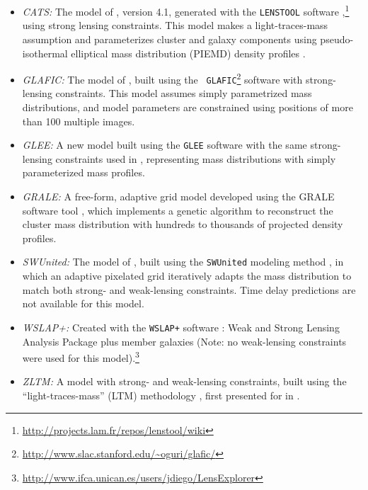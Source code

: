 \bigskip
\begin{itemize}
\item{{\it CATS:} The model of \citet{Jauzac:2014}, version 4.1, generated with
  the {\tt LENSTOOL} software
  \citep{Jullo:2007},\footnote{\url{http://projects.lam.fr/repos/lenstool/wiki}}}
  using strong lensing constraints.  This model makes a
  light-traces-mass assumption and parameterizes cluster and galaxy components
  using pseudo-isothermal elliptical mass distribution (PIEMD) density profiles
  \citep{Eliasdottir:2007, Limousin:2007}. 
\item{\it GLAFIC:} The model of \citet{Kawamata:2016}, built using the
  {\tt
    GLAFIC}\footnote{\url{http://www.slac.stanford.edu/~oguri/glafic/}}
  software \citep{Oguri:2010b} with strong-lensing constraints. This
  model assumes simply parametrized mass distributions, and model
  parameters are constrained using positions of more than 100 multiple
  images.
\item{\it GLEE:} A new model built using the {\tt GLEE} software
  \citep{Suyu:2010b, Suyu:2012} with the same strong-lensing
  constraints used in \citet{Caminha:2017}, representing mass
  distributions with simply parameterized mass profiles. 
\item{{\it GRALE:} A free-form, adaptive grid model developed using
  the GRALE software tool \citep{Liesenborgs:2006, Liesenborgs:2007,
    Mohammed:2014, Sebesta:2016}, which implements a genetic algorithm
  to reconstruct the cluster mass distribution with hundreds to
  thousands of projected \citet{Plummer:1911} density profiles.}
\item{\it SWUnited:} The model of \citet{Hoag:2016}, built using the
  {\tt SWUnited} modeling method \citep{Bradac:2005, Bradac:2009}, in
  which an adaptive pixelated grid iteratively adapts the mass
  distribution to match both strong- and weak-lensing constraints.
  Time delay predictions are not available for this model.
\item{\it WSLAP+:} Created with the {\tt WSLAP+} software
  \citep{Sendra:2014}: Weak and Strong Lensing Analysis Package plus
  member galaxies (Note: no weak-lensing constraints were used for
  this 
  model).\footnote{\url{http://www.ifca.unican.es/users/jdiego/LensExplorer}}
\item{{\it ZLTM:} A model with strong- and weak-lensing constraints,
  built using the ``light-traces-mass'' (LTM) methodology
  \citep{Zitrin:2009a,Zitrin:2015}, first presented for  in
  \citet{Zitrin:2013a}.}
\end{itemize}
\bigskip    


